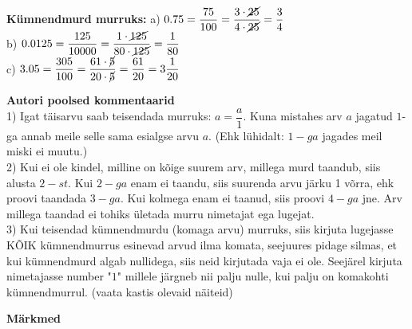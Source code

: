 {{{\begin{flushleft}
\vspace{5mm}
\hspace{5mm} \textbf{Kümnendmurd murruks:} a) $0.75 = \dfrac{75}{100}= \dfrac{3\cdot \cancel{25}}{4\cdot \cancel{25}}=\dfrac{3}{4}$\\
\vspace{5mm}
\hspace{50.5mm} b) $0.0125= \dfrac{125}{10 000}=\dfrac{1 \cdot \cancel{125}}{80 \cdot \cancel{125}}=\dfrac{1}{80}$\\
\vspace{5mm}
\hspace{50.5mm} c) $3.05=\dfrac{305}{100}=\dfrac{61 \cdot \cancel{5}}{20 \cdot \cancel{5}}=\dfrac{61}{20}=3\dfrac{1}{20}$

\end{flushleft}
}}}

\newpage

\textbf{Autori poolsed kommentaarid}\\

1) Igat täisarvu saab teisendada murruks: $a=\dfrac{a}{1}$. Kuna mistahes arv $a$ jagatud $1$-ga annab meile selle sama esialgse arvu $a$. (Ehk lühidalt: $1-ga$ jagades meil miski ei muutu.)\\

2) Kui ei ole kindel, milline on kõige suurem arv, millega murd taandub, siis alusta $2-st$. Kui $2-ga$ enam ei taandu, siis suurenda arvu järku 1 võrra, ehk proovi taandada $3-ga$. Kui kolmega enam ei taanud, siis proovi $4-ga$ jne. Arv millega taandad ei tohiks ületada murru nimetajat ega lugejat.\\

3) Kui teisendad kümnendmurdu (komaga arvu) murruks, siis kirjuta lugejasse KÕIK kümnendmurrus esinevad arvud ilma komata, seejuures pidage silmas, et kui kümnendmurd algab nullidega, siis neid kirjutada vaja ei ole. Seejärel kirjuta nimetajasse number "$1$" millele järgneb nii palju nulle, kui palju on komakohti kümnendmurrul. (vaata kastis olevaid näiteid)\\
\vspace{1.5cm}

\textbf{Märkmed}\\
\vspace{2mm}
\begin{mdframed}[style=graphpaper]
\vspace{14cm}
\end{mdframed}
